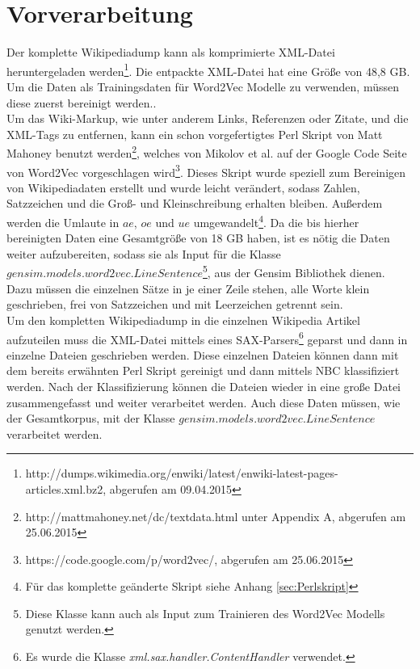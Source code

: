\documentclass[12pt,a4paper]{report}
\begin{document}
	\section{Vorverarbeitung}
	\label{sec:Vorverarbeitung}
	Der komplette Wikipediadump kann als komprimierte XML-Datei heruntergeladen werden\footnote{http://dumps.wikimedia.org/enwiki/latest/enwiki-latest-pages-articles.xml.bz2, abgerufen am 09.04.2015}. Die entpackte XML-Datei hat eine Größe von 48,8 GB. Um die Daten als Trainingsdaten für Word2Vec Modelle zu verwenden, müssen diese zuerst bereinigt werden..\\		
	Um das Wiki-Markup, wie unter anderem Links, Referenzen oder Zitate, und die XML-Tags zu entfernen, kann ein schon vorgefertigtes Perl Skript von Matt Mahoney benutzt werden\footnote{http://mattmahoney.net/dc/textdata.html unter Appendix A, abgerufen am 25.06.2015}, welches von Mikolov et al. auf der Google Code Seite von Word2Vec vorgeschlagen wird\footnote{https://code.google.com/p/word2vec/, abgerufen am 25.06.2015}. Dieses Skript wurde speziell zum Bereinigen von Wikipediadaten erstellt und wurde leicht verändert, sodass Zahlen, Satzzeichen und die Groß- und Kleinschreibung erhalten bleiben. Außerdem werden die Umlaute in $ae$, $oe$ und $ue$ umgewandelt\footnote{Für das komplette geänderte Skript siehe Anhang \ref{sec:Perlskript}}. Da die bis hierher bereinigten Daten eine Gesamtgröße von 18 GB haben, ist es nötig die Daten weiter aufzubereiten, sodass sie als Input für die Klasse $gensim.models.word2vec.LineSentence$\footnote{Diese Klasse kann auch als Input zum Trainieren des Word2Vec Modells genutzt werden.}, aus der Gensim Bibliothek dienen. Dazu müssen die einzelnen Sätze in je einer Zeile stehen, alle Worte klein geschrieben, frei von Satzzeichen und mit Leerzeichen getrennt sein.\\	
	Um den kompletten Wikipediadump in die einzelnen Wikipedia Artikel aufzuteilen muss die XML-Datei mittels eines SAX-Parsers\footnote{Es wurde die Klasse \textit{xml.sax.handler.ContentHandler} verwendet.} geparst und dann in einzelne Dateien geschrieben werden. Diese einzelnen Dateien können dann mit dem bereits erwähnten Perl Skript gereinigt und dann mittels NBC klassifiziert werden. Nach der Klassifizierung können die Dateien wieder in eine große Datei zusammengefasst und weiter verarbeitet werden. Auch diese Daten müssen, wie der Gesamtkorpus, mit der Klasse $gensim.models.word2vec.LineSentence$ verarbeitet werden.
	
	
\newpage
\end{document}

